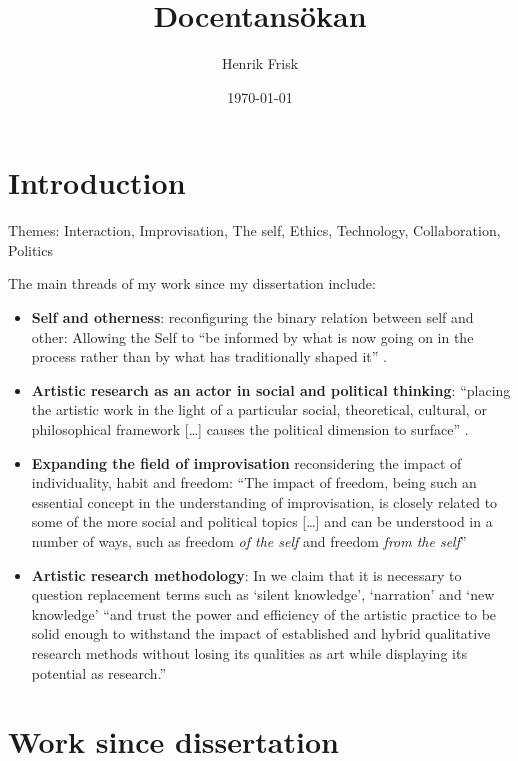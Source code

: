 \documentclass[a4paper]{article}
\title{Docentansökan}
\author{Henrik Frisk}
\date{\today}
\begin{document}
\maketitle

\thispagestyle{empty}

\section{Introduction}

Themes: Interaction, Improvisation, The self, Ethics, Technology, Collaboration, Politics


The main threads of my work since my dissertation include:

\begin{itemize}
\item \textbf{Self and otherness}: reconfiguring the binary relation between self and other: Allowing the Self to ``be informed by what is now going on in the process rather than by what has traditionally shaped it'' \citep{frisk2013}.
\item \textbf{Artistic research as an actor in social and political thinking}:  ``placing the artistic work in the light of a particular social, theoretical, cultural, or philosophical framework [\ldots] causes the political dimension to surface'' \cite{frisk-ost13}.
\item \textbf{Expanding the field of improvisation} reconsidering the impact of individuality, habit and freedom: ``The impact of freedom, being such an essential concept in the understanding of improvisation, is closely related to some of the more social and political topics [\ldots] and can be understood in a number of ways, such as freedom \emph{of the self} and freedom \emph{from the self}'' \cite{frisk12-improv}
\item \textbf{Artistic research methodology}: In \cite{frisk-ost13} we claim that it is necessary to question replacement terms such as `silent knowledge', `narration' and `new knowledge' ``and trust the power and efficiency of the artistic practice to be solid enough to withstand the impact of established and hybrid qualitative research methods without losing its qualities as art while displaying its potential as research.''
\end{itemize}

\section{Work since dissertation}
\end{document}
